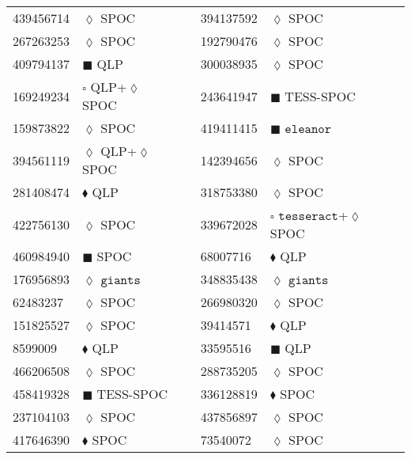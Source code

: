 \begin{longtable}{llrllr}
439456714 & $\lozenge$ SPOC & \cite{TIC_439456714} & 394137592 & $\lozenge$ SPOC & \cite{TIC_394137592} \\
267263253 & $\lozenge$ SPOC& \cite{TIC_267263253} & 192790476 & $\lozenge$ SPOC & \cite{TIC_428699140} \\
409794137 & $\blacksquare$ QLP & \cite{TIC_409794137} & 300038935 & $\lozenge$ SPOC & \cite{TIC_300038935} \\
169249234 & $\square$ QLP+$\lozenge$ SPOC & \cite{TIC_332558858} & 243641947 & $\blacksquare$ TESS-SPOC & \cite{TIC_243641947} \\
159873822 & $\lozenge$ SPOC & \cite{TIC_159873822} & 419411415 & $\blacksquare$ $\texttt{eleanor}$ & \cite{TIC_419411415} \\
394561119 & $\lozenge$ QLP+$\lozenge$ SPOC & \cite{TIC_394561119} & 142394656 & $\lozenge$ SPOC & \cite{TIC_142394656} \\
281408474 & $\blacklozenge$ QLP & \cite{TIC_409794137} & 318753380 & $\lozenge$ SPOC & \cite{TIC_428699140} \\
422756130 & $\lozenge$ SPOC & \cite{TIC_422756130} & 339672028 & $\square$ $\texttt{tesseract}$+$\lozenge$ SPOC & \cite{TIC_66561343} \\
460984940 & $\blacksquare$ SPOC & \cite{TIC_460984940} & 68007716 & $\blacklozenge$ QLP & \cite{TIC_156648452} \\
176956893 & $\lozenge$ $\texttt{giants}$ & \cite{TIC_176956893} & 348835438 & $\lozenge$ $\texttt{giants}$ & \cite{TIC_348835438} \\
62483237 & $\lozenge$ SPOC & \cite{TIC_428699140} & 266980320 & $\lozenge$ SPOC & \cite{TIC_70513361} \\
151825527 & $\lozenge$ SPOC & \cite{TIC_428699140} & 39414571 & $\blacklozenge$ QLP & \cite{TIC_156648452} \\
8599009 & $\blacklozenge$ QLP & \cite{TIC_156648452} & 33595516 & $\blacksquare$ QLP & \cite{TIC_33595516} \\
466206508 & $\lozenge$ SPOC & \cite{TIC_466206508} & 288735205 & $\lozenge$ SPOC & \cite{TIC_288735205} \\
458419328 & $\blacksquare$ TESS-SPOC & \cite{TIC_458419328} & 336128819 & $\blacklozenge$ SPOC & \cite{TIC_336128819} \\
237104103 & $\lozenge$ SPOC & \cite{TIC_219854185} & 437856897 & $\lozenge$ SPOC & \cite{TIC_437856897} \\
417646390 & $\blacklozenge$ SPOC & \cite{TIC_70524163} & 73540072 & $\lozenge$ SPOC & \cite{TIC_73540072} \\

\end{longtable}
